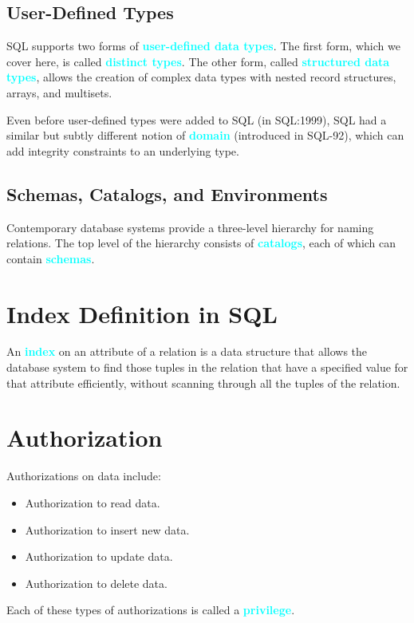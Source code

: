 \documentclass[a4paper,12pt,twoside,openany]{book}
\newcommand{\textcy}[1]{\textbf{\textcolor{cyan}{#1}}}
\begin{document}
\subsection{User-Defined Types}

SQL supports two forms of \textcy{user-defined data types}. The first form, which we cover here, is called \textcy{distinct types}. The other form, called \textcy{structured data types}, allows the creation of complex data types with nested record structures, arrays, and multisets.

Even before user-defined types were added to SQL (in SQL:1999), SQL had a similar but subtly different notion of \textcy{domain} (introduced in SQL-92), which can add integrity constraints to an underlying type.

\subsection{Schemas, Catalogs, and Environments}

Contemporary database systems provide a three-level hierarchy for naming relations. The top level of the hierarchy consists of \textcy{catalogs}, each of which can contain \textcy{schemas}.

\section{Index Definition in SQL}

An \textcy{index} on an attribute of a relation is a data structure that allows the database system to find those tuples in the relation that have a specified value for that attribute efficiently, without scanning through all the tuples of the relation.

\section{Authorization}

Authorizations on data include:
\begin{itemize}
    \item Authorization to read data.
    \item Authorization to insert new data.
    \item Authorization to update data.
    \item Authorization to delete data.
\end{itemize}
Each of these types of authorizations is called a \textcy{privilege}.
\end{document}
